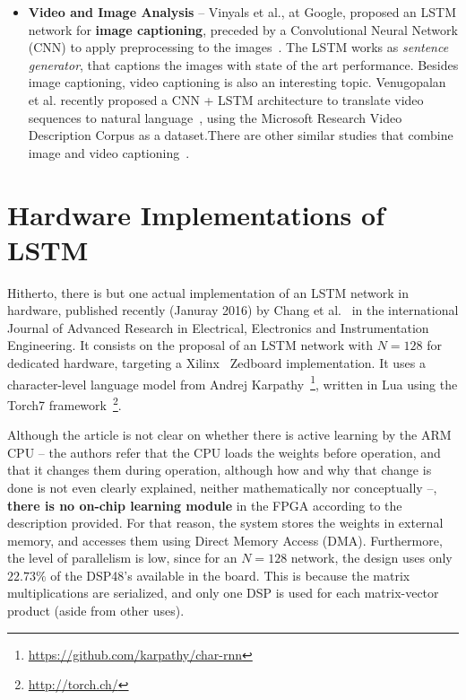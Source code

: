 \begin{itemize}
    \item \textbf{Video and Image Analysis} -- Vinyals et al., at Google, proposed an LSTM network for \textbf{image captioning}, preceded by a Convolutional Neural Network (CNN) to apply preprocessing to the images~\cite{Vinyals14}. The LSTM works as \emph{sentence generator}, that captions the images with state of the art performance.
        Besides image captioning, video captioning is also an interesting topic. Venugopalan et al. recently proposed a CNN + LSTM architecture to translate video sequences to natural language~\cite{Donahue14}, using the Microsoft Research Video Description Corpus as a dataset.There are other similar studies that combine image and video captioning~\cite{Donahue14_2}.
\end{itemize}

\section{Hardware Implementations of LSTM}\label{sec:sa_hardware}
Hitherto, there is but one actual implementation of an LSTM network in hardware, published recently
(Januray 2016) by Chang et al.~\cite{Chang15} in the international Journal of Advanced Research in
Electrical, Electronics and Instrumentation Engineering. It consists on the proposal of an LSTM network with $N=128$ for dedicated hardware,
targeting a Xilinx\textregistered~ Zedboard implementation. It uses a character-level language model from Andrej
Karpathy~\footnote{\href{https://github.com/karpathy/char-rnn}{https://github.com/karpathy/char-rnn}}, written in
Lua using the Torch7 framework~\footnote{\href{http://torch.ch/}{http://torch.ch/}}.

Although the article is not clear on whether there is active learning by the ARM CPU -- the authors refer that the CPU
loads the weights before operation, and that it changes them during operation, although how and why that change is done
is not even clearly explained, neither mathematically nor conceptually --, \textbf{there is no on-chip learning module}
in the FPGA according to the description provided. For that reason, the system stores the weights in external memory,
and accesses them using Direct Memory Access (DMA). Furthermore, the level of parallelism is low, since for an
$N=128$ network, the design uses only $22.73\%$ of the DSP48's available in the board. This is because the matrix multiplications
are serialized, and only one DSP is used for each matrix-vector product (aside from other uses).

